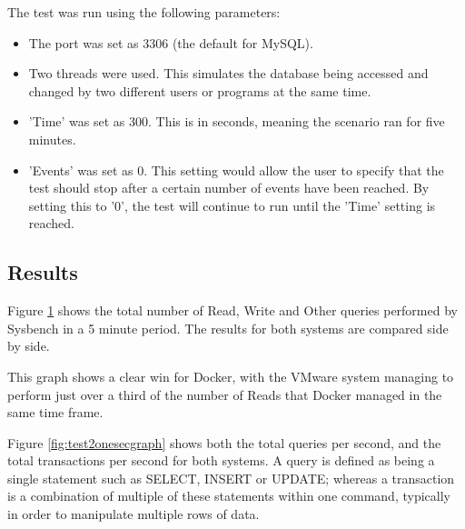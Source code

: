 The test was run using the following parameters:
\begin{itemize}
  \item The port was set as 3306 (the default for MySQL).
  \item Two threads were used. This simulates the database being accessed and changed by two different users or programs at the same time.
  \item 'Time' was set as 300. This is in seconds, meaning the scenario ran for five minutes.
  \item 'Events' was set as 0. This setting would allow the user to specify that the test should stop after a certain number of events have been reached. By setting this to '0', the test will continue to run until the 'Time' setting is reached.
\end{itemize}
\subsection{Results}

Figure \ref{fig:test2fiveminutes} shows the total number of Read, Write and Other queries performed by Sysbench in a 5 minute period. The results for both systems are compared side by side.

This graph shows a clear win for Docker, with the VMware system managing to perform just over a third of the number of Reads that Docker managed in the same time frame.

\begin{figure}[H]
\caption{}
\label{fig:test2fiveminutes}
\centering
\end{figure}

Figure \ref{fig:test2onesecgraph} shows both the total queries per second, and the total transactions per second for both systems. A query is defined as being a single statement such as SELECT, INSERT or UPDATE\citep{mysqlqueries}; whereas a transaction is a combination of multiple of these statements within one command\citep{mysqltransactions}, typically in order to manipulate multiple rows of data.

